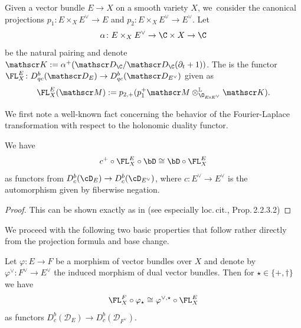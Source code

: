 \begin{dfn}
Given a vector bundle $E \to X$ on a smooth variety $X$, we~consider the canonical projections $p_1 \colon E \times_X E^\vee \to E$ and $p_2 \colon E \times_X E^\vee \to E^\vee$. Let
\[
\alpha \colon E \times_X E^\vee \to \C \times X \to \C
\]
be the natural pairing and denote $\mathscr K := \alpha^+(\mathscr D_\C/\mathscr D_\C(\partial_t+1))$.
The  is the functor $\FL_X^E \colon D_{qc}^b(\mathscr D_E) \to D_{qc}^b(\mathscr D_{E^\vee})$ given as
\[
\FL_X^E(\mathscr M) := p_{2,+} (p_1^+ \mathscr M \otimes^{\mathbb L}_{\O_{E\!\times\!E^\vee}} \mathscr K).\qedhere
\]
\end{dfn}

We first note a well-known fact concerning the behavior of the Fourier-Laplace transformation with respect to the holonomic duality functor.

\begin{lem}\label{lem:DualFourier}
We have
\[
c^+ \circ \FL_X^E \circ \bD \cong \bD \circ \FL_X^E
\]
as functors from $D^b_c(\cD_E) \to D^b_c(\cD_{E^\vee})$,
where $c:E^\vee \to E^\vee$ is the
automorphism given by fiberwise negation.
\end{lem}

\begin{proof}
This can be shown exactly as in \cite[Cor.\,2.2.2.1., 4)]{Daia} (see especially loc.\,cit., Prop.\,2.2.3.2)
\end{proof}

We proceed with the following two basic properties that follow rather directly from the projection formula and base change.

\begin{lem} \label{lem:FLBundleMorphism}
Let $\varphi \colon E \to F$ be a morphism of vector bundles over $X$ and denote by $\varphi^\vee \colon F^\vee \to E^\vee$ the induced morphism of dual vector bundles. Then for $\star\in\{+,\dag\}$ we have
\[
\FL_X^F \circ \varphi_\star \cong \varphi^{\vee,\star} \circ \FL_X^E
\]
as functors $D_{c}^b(\mathscr D_E) \to D_{c}^b(\mathscr D_{F^\vee})$.
\end{lem}

